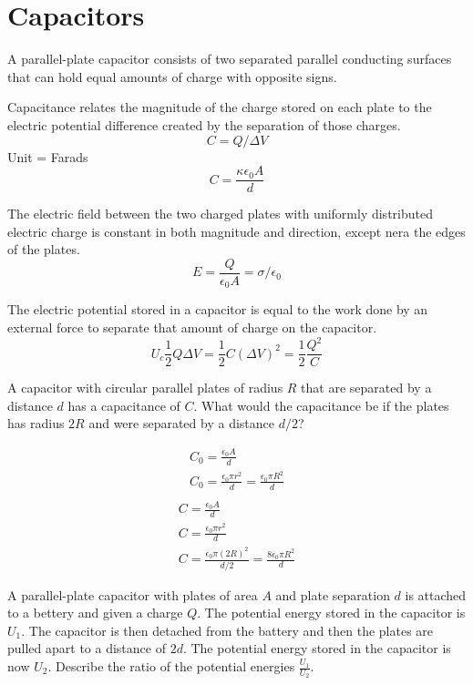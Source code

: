\documentclass[../em.tex]{subfiles}
\begin{document}
\section{Capacitors}
A parallel-plate capacitor consists of two separated parallel conducting surfaces 
that can hold equal amounts of charge with opposite signs.

Capacitance relates the magnitude of the charge stored on each plate to the electric 
potential difference created by the separation of those charges.
\[C = Q/\Delta V\] 
Unit = Farads
\[C = \frac{\kappa \epsilon_0 A}{d}\]

The electric field between the two charged plates with uniformly distributed 
electric charge is constant in both magnitude and direction, except nera the edges of the plates.
\[E = \frac{Q}{\epsilon_0 A} = \sigma/\epsilon_0\]

The electric potential stored in a capacitor is equal to the work done by an external force 
to separate that amount of charge on the capacitor.
\[U_c \frac{1}{2}Q\Delta V = \frac{1}{2}C(\Delta V)^2 = \frac{1}{2}\frac{Q^2}{C}\]

\begin{example}
    A capacitor with circular parallel plates of radius $R$ that are separated by a distance $d$ 
    has a capacitance of $C$. What would the capacitance be if the plates has radius $2R$ and 
    were separated by a distance $d/2$?

    \begin{align*}
        C_0 = \frac{\epsilon_0 A}{d}\\ 
        C_0 = \frac{\epsilon_0\pi r^2}{d}=\frac{\epsilon_0 \pi R^2}{d}\\
    \end{align*}
    \begin{align*}
        C = \frac{\epsilon_0 A}{d}\\
        C = \frac{\epsilon_0 \pi r^2}{d}\\
        C = \frac{\epsilon_0 \pi (2R)^2}{d/2} = \frac{8\epsilon_0\pi R^2}{d}
    \end{align*}
\end{example}

\ex A parallel-plate capacitor with plates of area $A$ and plate separation $d$ is attached to a bettery and given a charge $Q$. The potential energy stored in the capacitor is $U_1$. The capacitor is then detached from the battery 
and then the plates are pulled apart to a distance of $2d$. The potential energy stored in the capacitor is now $U_2$. 
Describe the ratio of the potential energies $\frac{U_1}{U_2}$.
\end{document}
